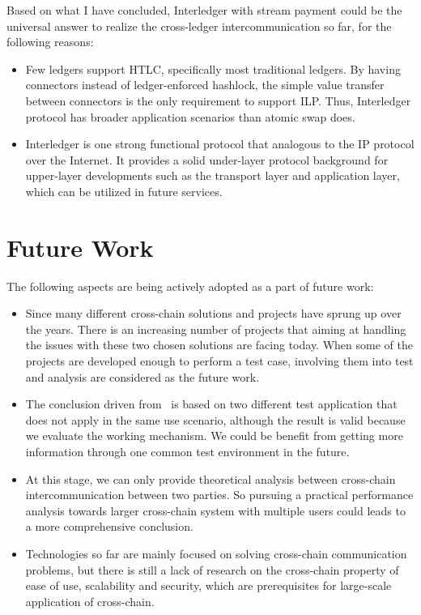 \noindent Based on what I have concluded, Interledger with stream payment could be the universal answer to realize the cross-ledger intercommunication so far, for the following reasons:
\begin{itemize}
    \item Few ledgers support HTLC, specifically most traditional ledgers. By having connectors instead of ledger-enforced hashlock, the simple value transfer between connectors is the only requirement to support ILP. Thus, Interledger protocol has broader application scenarios than atomic swap does.
    \item Interledger is one strong functional protocol that analogous to the IP protocol over the Internet. It provides a solid under-layer protocol background for upper-layer developments such as the transport layer and application layer, which can be utilized in future services.  
\end{itemize}

\section{Future Work}
\noindent The following aspects are being actively adopted as a part of future work:
\begin{itemize}
	\item Since many different cross-chain solutions and projects have sprung up over the years. There is an increasing number of projects that aiming at handling the issues with these two chosen solutions are facing today. When some of the projects are developed enough to perform a test case, involving them into test and analysis are considered as the future work.
	\item The conclusion driven from~ is based on two different test application that does not apply in the same use scenario, although the result is valid because we evaluate the working mechanism. We could be benefit from getting more information through one common test environment in the future.
	\item At this stage, we can only provide theoretical analysis between cross-chain intercommunication between two parties. So pursuing a practical performance analysis towards larger cross-chain system with multiple users could leads to a more comprehensive conclusion.
	\item Technologies so far are mainly focused on solving cross-chain communication problems, but there is still a lack of research on the cross-chain property of ease of use, scalability and security, which are prerequisites for large-scale application of cross-chain.

	
\end{itemize}  